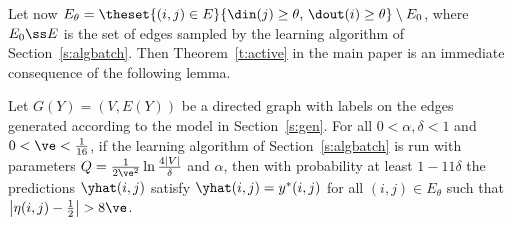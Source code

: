 Let now $E_{\theta} = \theset{(i,j) \in E}{\din(j) \ge \theta,\, \dout(i) \ge \theta} \setminus E_0$, where $E_0 \ss E$ is the set of edges sampled by the learning algorithm of Section~\ref{s:algbatch}. Then Theorem~\ref{t:active} in the main paper is an immediate consequence of the following lemma. 
%
\begin{lemma}\label{l:active}
Let $G(Y) = (V,E(Y))$ be a directed graph with labels on the edges generated according to the model in Section~\ref{s:gen}.
For all $0 < \alpha,\delta < 1$ and $0 < \ve < \tfrac{1}{16}$, if the learning algorithm of Section~\ref{s:algbatch} is run with parameters $Q = \tfrac{1}{2\ve^2}\ln\frac{4|V|}{\delta}$ and $\alpha$, then with probability at least $1-11\delta$ the predictions $\yhat(i,j)$ satisfy $\yhat(i,j) = y^*(i,j)$ for all $(i,j) \in E_{\theta}$ such that $\big|\eta(i,j) - \tfrac{1}{2}\big| > 8\ve$.
\end{lemma}
%
